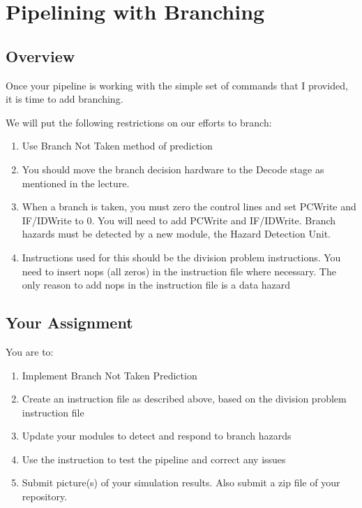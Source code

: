 \chapter{Pipelining with Branching}


\section{Overview}
Once your pipeline is working with the simple set of commands that I provided, it is time to add branching.  

We will put the following restrictions on our efforts to branch:
\begin{enumerate}
	\item Use Branch Not Taken method of prediction
	\item You should move the branch decision hardware to the Decode stage as mentioned in the lecture. 
	\item When a branch is taken, you must zero the control lines and set PCWrite and IF/IDWrite to 0.  You will need to add PCWrite and IF/IDWrite.  Branch hazards must be detected by a new module, the Hazard Detection Unit.
	\item Instructions used for this should be the division problem instructions.  You need to insert nops (all zeros) in the instruction file where necessary.  The only reason to add nops in the instruction file is a data hazard
\end{enumerate}  

\section{Your Assignment}

You are to:
\begin{enumerate}
\item Implement Branch Not Taken Prediction
\item Create an instruction file as described above, based on the division problem instruction file
\item Update your modules to detect and respond to branch hazards
\item Use the instruction to test the pipeline and correct any issues
\item Submit picture(s) of your simulation results.  Also submit a zip file of your repository.
\end{enumerate} 